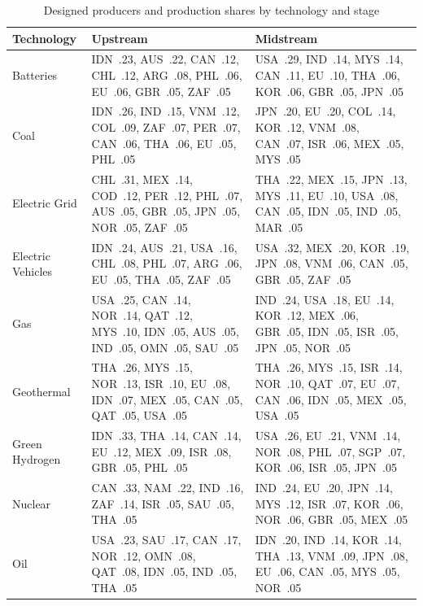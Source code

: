 \begin{table}[htbp]
\centering
\begin{threeparttable}
\caption{Designed producers and production shares by technology and stage}
\label{tab:network_producers}
\footnotesize
\begin{tabularx}{\textwidth}{@{}>{\raggedright\arraybackslash}p{2.1cm} >{\raggedright\arraybackslash}X >{\raggedright\arraybackslash}X@{}}
\toprule
Technology & Upstream & Midstream \\
\midrule
Batteries & IDN~.23, AUS~.22, CAN~.12, CHL~.12, ARG~.08, PHL~.06, EU~.06, GBR~.05, ZAF~.05 & USA~.29, IND~.14, MYS~.14, CAN~.11, EU~.10, THA~.06, KOR~.06, GBR~.05, JPN~.05 \\
Coal & IDN~.26, IND~.15, VNM~.12, COL~.09, ZAF~.07, PER~.07, CAN~.06, THA~.06, EU~.05, PHL~.05 & JPN~.20, EU~.20, COL~.14, KOR~.12, VNM~.08, CAN~.07, ISR~.06, MEX~.05, MYS~.05 \\
Electric Grid & CHL~.31, MEX~.14, COD~.12, PER~.12, PHL~.07, AUS~.05, GBR~.05, JPN~.05, NOR~.05, ZAF~.05 & THA~.22, MEX~.15, JPN~.13, MYS~.11, EU~.10, USA~.08, CAN~.05, IDN~.05, IND~.05, MAR~.05 \\
Electric Vehicles & IDN~.24, AUS~.21, USA~.16, CHL~.08, PHL~.07, ARG~.06, EU~.05, THA~.05, ZAF~.05 & USA~.32, MEX~.20, KOR~.19, JPN~.08, VNM~.06, CAN~.05, GBR~.05, ZAF~.05 \\
Gas & USA~.25, CAN~.14, NOR~.14, QAT~.12, MYS~.10, IDN~.05, AUS~.05, IND~.05, OMN~.05, SAU~.05 & IND~.24, USA~.18, EU~.14, KOR~.12, MEX~.06, GBR~.05, IDN~.05, ISR~.05, JPN~.05, NOR~.05 \\
Geothermal & THA~.26, MYS~.15, NOR~.13, ISR~.10, EU~.08, IDN~.07, MEX~.05, CAN~.05, QAT~.05, USA~.05 & THA~.26, MYS~.15, ISR~.14, NOR~.10, QAT~.07, EU~.07, CAN~.06, IDN~.05, MEX~.05, USA~.05 \\
Green Hydrogen & IDN~.33, THA~.14, CAN~.14, EU~.12, MEX~.09, ISR~.08, GBR~.05, PHL~.05 & USA~.26, EU~.21, VNM~.14, NOR~.08, PHL~.07, SGP~.07, KOR~.06, ISR~.05, JPN~.05 \\
Nuclear & CAN~.33, NAM~.22, IND~.16, ZAF~.14, ISR~.05, SAU~.05, THA~.05 & IND~.24, EU~.20, JPN~.14, MYS~.12, ISR~.07, KOR~.06, NOR~.06, GBR~.05, MEX~.05 \\
Oil & USA~.23, SAU~.17, CAN~.17, NOR~.12, OMN~.08, QAT~.08, IDN~.05, IND~.05, THA~.05 & IDN~.20, IND~.14, KOR~.14, THA~.13, VNM~.09, JPN~.08, EU~.06, CAN~.05, MYS~.05, NOR~.05 \\

\end{tabularx}
\end{threeparttable}
\end{table}
